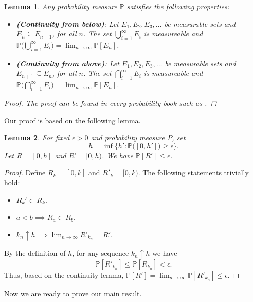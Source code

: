 \documentclass[]{article}
\newtheorem{lemma}{Lemma}
\begin{document}
\begin{lemma}
Any probability measure $\mathbb{P}$ satisfies the following properties:

\begin{itemize}
	\item \textbf{(Continuity from below)}: Let $E_1, E_2, E_3, \dots$ be measurable sets and $E_n \subseteq E_{n+1}$, for all $n$. The set $\bigcup_{i = 1}^{\infty} E_i$ is measureable and $\mathbb{P}\Big(\bigcup_{i = 1}^{\infty} E_i\Big) = \lim_{n\to \infty} \mathbb{P}[E_n]$.
	
	\item \textbf{(Continuity from above)}: Let $E_1, E_2, E_3, \dots$ be measurable sets and $E_{n+1} \subseteq E_{n}$, for all $n$. The set $\bigcap_{i = 1}^{\infty} E_i$ is measureable and $\mathbb{P}\Big(\bigcap_{i = 1}^{\infty} E_i\Big) = \lim_{n\to \infty} \mathbb{P}[E_n]$.
\end{itemize}

\begin{proof}
The proof can be found in every probability book such as \cite{grimmett}.
\end{proof}

\end{lemma}

Our proof is based on the following lemma.
\begin{lemma}
	\label{lem1}
	For fixed $\epsilon>0$ and probability measure $P$, set 
	$$h = \inf \Big\{h' : \mathbb{P}\big([0, h']\big)\geq\epsilon\Big\}.$$
	Let $R = [0, h]$ and $R' = [0, h)$. We have $\mathbb{P}[R'] \leq \epsilon$.
\end{lemma}

\begin{proof}
	Define $R_k = [0, k]$ and $R'_k = [0, k)$. The following statements trivially hold:
	\begin{itemize}
		\item $R_k' \subset R_k$.
		\item $a< b \implies R_a \subset R_b$.
		\item $k_n \uparrow h \implies \lim_{n\to \infty} R'_{k_n} = R'$.
	\end{itemize}
	By the definition of $h$, for any sequence $k_n \uparrow h$ we have
	$$\mathbb{P}[R'_{k_n}] \leq \mathbb{P}[R_{k_n}]<\epsilon.$$
	Thus, based on the continuity lemma, $\mathbb{P}[R'] = \lim_{n\to \infty}\mathbb{P}[R'_{k_n}] \leq \epsilon$.
\end{proof}

Now we are ready to prove our main result.
\end{document}
